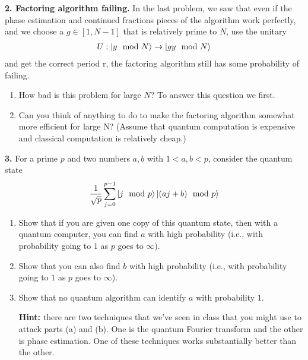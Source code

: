 \documentclass{article}
\theoremstyle{definition}
\newcommand{\f}[2]{\frac{#1}{#2}}
\begin{document}
\newpage

\noindent \textbf{2. Factoring algorithm failing.} In the last problem, we saw that even if the phase estimation and continued fractions pieces of the algorithm work perfectly, and we choose a  $g\in [1,N-1]$ that is relatively prime to $N$, use the unitary
\begin{align*}
U : \ket{ y \mod N}  \to \ket{gy \mod N}
\end{align*}
and get the correct period r, the factoring algorithm still has some probability of failing.

\begin{enumerate}[label=(\alph*)]

\item How bad is this problem for large $N$? To answer this question we first. 

\item Can you think of anything to do to make the factoring algorithm somewhat more efficient for large N? (Assume that quantum computation is expensive and classical computation is relatively cheap.)


\end{enumerate}



\newpage


\noindent \textbf{3. } For a prime $p$ and two numbers $a,b$ with $1 < a, b < p$, consider the quantum state
\begin{align*}
\f{1}{\sqrt{p}} \sum^{p-1}_{j=0} \ket{ j \mod p } \ket{(aj + b) \mod p}
\end{align*}

\begin{enumerate}[label=(\alph*)]

\item Show that if you are given one copy of this quantum state, then with a quantum computer, you can find $a$ with high probability (i.e., with probability going to $1$ as $p$ goes to $\infty$). 

\item Show that you can also find $b$ with high probability (i.e., with probability going to $1$ as $p$ goes to $\infty$).

\item Show that no quantum algorithm can identify $a$ with probability $1$.

\textbf{Hint:} there are two techniques that we’ve seen in class that you might use to attack parts (a) and (b). One is the quantum Fourier transform and the other is phase estimation. One of these techniques works substantially better than the other.


\end{enumerate}
\end{document}
